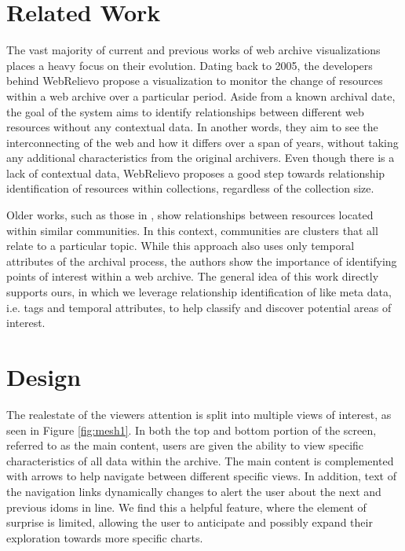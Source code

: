 \documentclass[10pt,journal,compsoc]{IEEEtran}
\begin{document}
\section{Related Work}
The vast majority of current and previous works of web archive visualizations places a heavy focus on their evolution. Dating back to 2005, the developers behind WebRelievo \cite{toyoda2005system} propose a visualization to monitor the change of resources within a web archive over a particular period. Aside from a known archival date, the goal of the system aims to identify relationships between different web resources without any contextual data. In another words, they aim to see the interconnecting of the web and how it differs over a span of years, without taking any additional characteristics from the original archivers. Even though there is a lack of contextual data, WebRelievo proposes a good step towards relationship identification of resources within collections, regardless of the collection size. \par

Older works, such as those in \cite{toyoda2003extracting}, show relationships between resources located within similar communities. In this context, communities are clusters that all relate to a particular topic. While this approach also uses only temporal attributes of the archival process, the authors show the importance of identifying points of interest within a web archive. The general idea of this work directly supports ours, in which we leverage relationship identification of like meta data, i.e. tags and temporal attributes, to help classify and discover potential areas of interest. \par


\section{Design}
The realestate of the viewers attention is split into multiple views of interest, as seen in Figure \ref{fig:mesh1}. In both the top and bottom portion of the screen, referred to as the main content, users are given the ability to view specific characteristics of all data within the archive. The main content is complemented with arrows to help navigate between different specific views. In addition, text of the navigation links dynamically changes to alert the user about the next and previous idoms in line. We find this a helpful feature, where the element of surprise is limited, allowing the user to anticipate and possibly expand their exploration towards more specific charts.  \par
\end{document}
